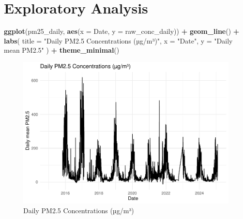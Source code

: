\documentclass[
]{article}
\newenvironment{Shaded}{\begin{snugshade}}{\end{snugshade}}
\newcommand{\AttributeTok}[1]{\textcolor[rgb]{0.13,0.29,0.53}{#1}}
\newcommand{\FunctionTok}[1]{\textcolor[rgb]{0.13,0.29,0.53}{\textbf{#1}}}
\newcommand{\NormalTok}[1]{#1}
\newcommand{\SpecialCharTok}[1]{\textcolor[rgb]{0.81,0.36,0.00}{\textbf{#1}}}
\newcommand{\StringTok}[1]{\textcolor[rgb]{0.31,0.60,0.02}{#1}}
\begin{document}
\newpage

\section{Exploratory Analysis}\label{exploratory-analysis}

\begin{Shaded}
\begin{Highlighting}[]
\FunctionTok{ggplot}\NormalTok{(pm25\_daily, }\FunctionTok{aes}\NormalTok{(}\AttributeTok{x =}\NormalTok{ Date, }\AttributeTok{y =}\NormalTok{ raw\_conc\_daily)) }\SpecialCharTok{+}
  \FunctionTok{geom\_line}\NormalTok{() }\SpecialCharTok{+}
  \FunctionTok{labs}\NormalTok{(}
    \AttributeTok{title =} \StringTok{"Daily PM2.5 Concentrations (µg/m³)"}\NormalTok{,}
    \AttributeTok{x =} \StringTok{"Date"}\NormalTok{,}
    \AttributeTok{y =} \StringTok{"Daily mean PM2.5"}
\NormalTok{  ) }\SpecialCharTok{+}
  \FunctionTok{theme\_minimal}\NormalTok{()}
\end{Highlighting}
\end{Shaded}

\begin{figure}
\centering
\includegraphics{Project_Report_files/figure-latex/pm25-daily-trend-1.pdf}
\caption{Daily PM2.5 Concentrations (µg/m³)}
\end{figure}
\end{document}
